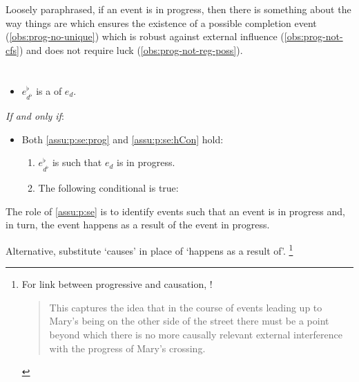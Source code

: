 \begin{note}
  \noindent%
  Loosely paraphrased, if an event is in progress, then there is something about the way things are which ensures the existence of a possible completion event (\autoref{obs:prog-no-unique}) which is robust against external influence (\autoref{obs:prog-not-cfs}) and does not require luck (\autoref{obs:prog-not-reg-poss}).
\end{note}


\section{}

\begin{note}
  \begin{definition}[\se{3}]
    \label{assu:p:se}
    \vspace{-\baselineskip}
    \begin{itemize}
    \item
      \(e^{\flat}_{d^{\flat}}\) is a \emph{} of \(e_{d}\).
    \end{itemize}
    \emph{If and only if}:
    \begin{itemize}
    \item
      Both \ref{assu:p:se:prog} and \ref{assu:p:se:hCon} hold:
    \begin{enumerate}[label=\arabic*., ref=(\arabic*)]
    \item
      \label{assu:p:se:prog}
      \(e^{\flat}_{d^{\flat}}\) is such that \(e_{d}\) is in progress.
    \item
      \label{assu:p:se:hCon}
      The following conditional is true:
    \end{enumerate}
  \end{itemize}
  \vspace{-\baselineskip}
  \end{definition}

  \noindent%
  The role of \autoref{assu:p:se} is to identify events such that an event is in progress and, in turn, the event happens as a result of the event in progress.

  Alternative, substitute `causes' in place of `happens as a result of'.%
  \footnote{
    For link between progressive and causation, \textcite{Szabo:2004ul}!

    \begin{quote}
      This captures the idea that in the course of events leading up to Mary’s being on the other side of the street there must be a point beyond which there is no more causally relevant external interference with the progress of Mary’s crossing.
    \end{quote}
  }
\end{note}


